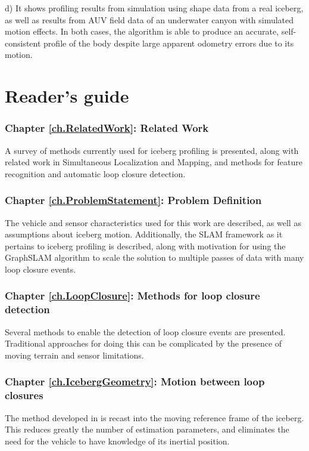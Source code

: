 d) It shows profiling results from simulation using shape data from a real iceberg, as well as results from AUV field data of an underwater canyon with simulated motion effects. In both cases, the algorithm is able to produce an accurate, self-consistent profile of the body despite large apparent odometry errors due to its motion.  

\section{Reader's guide}

\subsubsection*{Chapter \ref{ch.RelatedWork}: Related Work} A survey of methods currently used for iceberg profiling is presented, along with related work in Simultaneous Localization and Mapping, and methods for feature recognition and automatic loop closure detection.

\subsubsection*{Chapter \ref{ch.ProblemStatement}: Problem Definition} The vehicle and sensor characteristics used for this work are described, as well as assumptions about iceberg motion. Additionally, the SLAM framework as it pertains to iceberg profiling is described, along with motivation for using the GraphSLAM algorithm to scale the solution to multiple passes of data with many loop closure events.

\subsubsection*{Chapter \ref{ch.LoopClosure}: Methods for loop closure detection} Several methods to enable the detection of loop closure events are presented. Traditional approaches for doing this can be complicated by the presence of moving terrain and sensor limitations.

\subsubsection*{Chapter \ref{ch.IcebergGeometry}: Motion between loop closures}  The method developed in \cite{Kimball2011b} is recast into the moving reference frame of the iceberg. This reduces greatly the number of estimation parameters, and eliminates the need for the vehicle to have knowledge of its inertial position.


